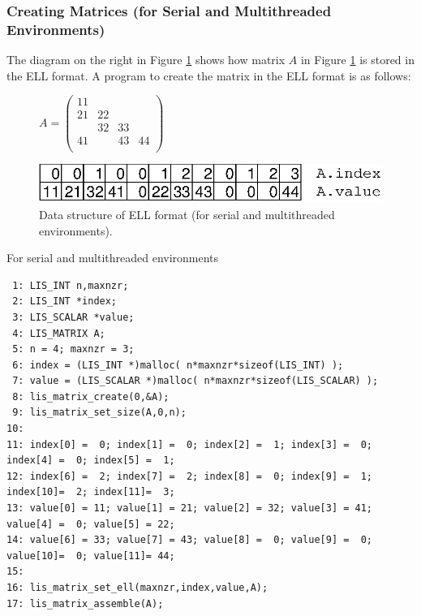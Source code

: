 \documentclass[a4paper]{article}
\begin{document}
\subsubsection{Creating Matrices (for Serial and Multithreaded Environments)}
The diagram on the right in Figure \ref{fig:storage05} shows how matrix $A$ in Figure \ref{fig:storage05} is stored in the ELL format. A program to create the matrix in the ELL format is as follows:
\begin{figure}[h]
{\centering 
\begin{minipage}{0.3\textwidth}
\begin{flushright}
$ 
A = \left(
\begin{array}{cccc}
11 &    &    &    \\
21 & 22 &    &    \\
   & 32 & 33 &    \\
41 &    & 43 & 44 \\
\end{array}\right)
$
\end{flushright}
\end{minipage}
\begin{minipage}{0.6\textwidth}
\begin{flushleft}
\includegraphics{storage05.eps} 
\end{flushleft}
\end{minipage}
\caption{Data structure of ELL format (for serial and multithreaded environments).}\label{fig:storage05}}
\end{figure}
\begin{itemsquarebox}[l]{For serial and multithreaded environments}
\small
\begin{verbatim}
 1: LIS_INT n,maxnzr;
 2: LIS_INT *index;
 3: LIS_SCALAR *value;
 4: LIS_MATRIX A;
 5: n = 4; maxnzr = 3;
 6: index = (LIS_INT *)malloc( n*maxnzr*sizeof(LIS_INT) );
 7: value = (LIS_SCALAR *)malloc( n*maxnzr*sizeof(LIS_SCALAR) );
 8: lis_matrix_create(0,&A);
 9: lis_matrix_set_size(A,0,n);
10:
11: index[0] =  0; index[1] =  0; index[2] =  1; index[3] =  0; index[4] =  0; index[5] =  1;
12: index[6] =  2; index[7] =  2; index[8] =  0; index[9] =  1; index[10]=  2; index[11]=  3;
13: value[0] = 11; value[1] = 21; value[2] = 32; value[3] = 41; value[4] =  0; value[5] = 22;
14: value[6] = 33; value[7] = 43; value[8] =  0; value[9] =  0; value[10]=  0; value[11]= 44;
15:
16: lis_matrix_set_ell(maxnzr,index,value,A);
17: lis_matrix_assemble(A);
\end{verbatim}
\end{itemsquarebox}
\end{document}

